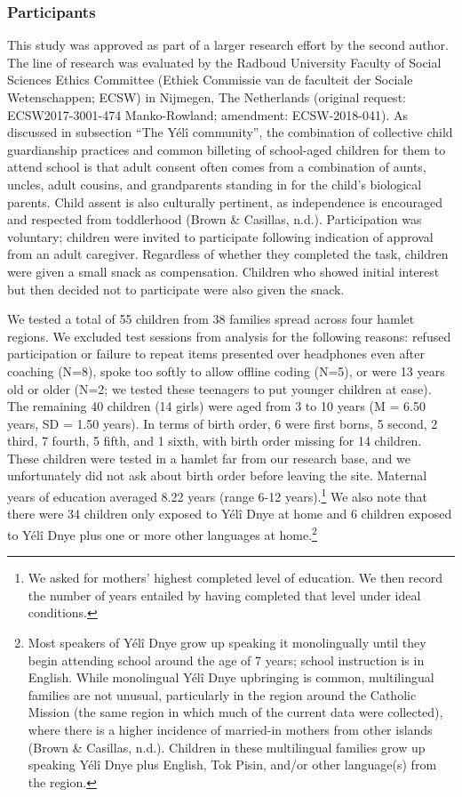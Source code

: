 \documentclass[english,,man,floatsintext]{apa6}
\begin{document}
\hypertarget{participants}{%
\subsubsection{Participants}\label{participants}}

This study was approved as part of a larger research effort by the second author. The line of research was evaluated by the Radboud University Faculty of Social Sciences Ethics Committee (Ethiek Commissie van de faculteit der Sociale Wetenschappen; ECSW) in Nijmegen, The Netherlands (original request: ECSW2017-3001-474 Manko-Rowland; amendment: ECSW-2018-041). As discussed in subsection \enquote{The Yélî community}, the combination of collective child guardianship practices and common billeting of school-aged children for them to attend school is that adult consent often comes from a combination of aunts, uncles, adult cousins, and grandparents standing in for the child's biological parents. Child assent is also culturally pertinent, as independence is encouraged and respected from toddlerhood (Brown \& Casillas, n.d.). Participation was voluntary; children were invited to participate following indication of approval from an adult caregiver. Regardless of whether they completed the task, children were given a small snack as compensation. Children who showed initial interest but then decided not to participate were also given the snack.

We tested a total of 55 children from 38 families spread across four hamlet regions. We excluded test sessions from analysis for the following reasons: refused participation or failure to repeat items presented over headphones even after coaching (N=8), spoke too softly to allow offline coding (N=5), or were 13 years old or older (N=2; we tested these teenagers to put younger children at ease). The remaining 40 children (14 girls) were aged from 3 to 10 years (M = 6.50 years, SD = 1.50 years). In terms of birth order, 6 were first borns, 5 second, 2 third, 7 fourth, 5 fifth, and 1 sixth, with birth order missing for 14 children. These children were tested in a hamlet far from our research base, and we unfortunately did not ask about birth order before leaving the site. Maternal years of education averaged 8.22 years (range 6-12 years).\footnote{We asked for mothers' highest completed level of education. We then record the number of years entailed by having completed that level under ideal conditions.} We also note that there were 34 children only exposed to Yélî Dnye at home and 6 children exposed to Yélî Dnye plus one or more other languages at home.\footnote{Most speakers of Yélî Dnye grow up speaking it monolingually until they begin attending school around the age of 7 years; school instruction is in English. While monolingual Yélî Dnye upbringing is common, multilingual families are not unusual, particularly in the region around the Catholic Mission (the same region in which much of the current data were collected), where there is a higher incidence of married-in mothers from other islands (Brown \& Casillas, n.d.). Children in these multilingual families grow up speaking Yélî Dnye plus English, Tok Pisin, and/or other language(s) from the region.}
\end{document}

